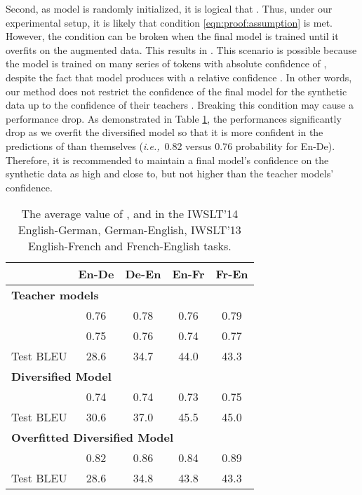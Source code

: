 \documentclass{article}
\newcommand{\ie}{{\em i.e.,}\xspace}
\begin{document}
Second, as model  is randomly initialized, it is logical that . Thus, under our experimental setup, it is likely that condition \ref{eqn:proof:assumption} is met. However, the condition can be broken when the final model  is trained until it overfits on the augmented data. This results in . This scenario is possible because the model  is trained on many series of tokens  with absolute confidence of , despite the fact that model  produces  with a relative confidence . In other words, our method does not restrict the confidence of the final model  for the synthetic data up to the confidence of their teachers . Breaking this condition may cause a performance drop. As demonstrated in Table \ref{table:avg_en_prob_cond}, the performances significantly drop as we overfit the diversified model  so that it is more confident in the predictions of  than  themselves (\ie\ 0.82 versus 0.76 probability for En-De). Therefore, it is recommended to maintain a final model's confidence on the synthetic data as high and close to, but not higher than the teacher models' confidence.


\begin{table}[t]
\begin{center}
\caption{The average value of ,  and  in the IWSLT'14 English-German, German-English, IWSLT'13 English-French and French-English tasks.}
\begin{tabular}{lcccc}
\toprule
& {\bf En-De} & {\bf De-En} & {\bf En-Fr} & {\bf Fr-En}\\
\midrule
\multicolumn{5}{l}{\bf Teacher models }\\
             & 0.76  & 0.78   & 0.76    & 0.79\\
   & 0.75  & 0.76   & 0.74    & 0.77\\
Test BLEU                                       & 28.6  & 34.7   & 44.0    & 43.3\\
\midrule
\multicolumn{5}{l}{\bf Diversified Model }\\
     & 0.74  & 0.74    & 0.73    & 0.75     \\
Test BLEU                                       & 30.6  & 37.0    & 45.5    & 45.0    \\
\midrule
\multicolumn{5}{l}{\bf Overfitted Diversified Model }\\
     & 0.82  & 0.86    & 0.84    & 0.89     \\
Test BLEU                                       & 28.6  & 34.8    & 43.8    & 43.3 \\
\bottomrule
\end{tabular}
\label{table:avg_en_prob_cond}
\end{center}
\end{table}
\end{document}
